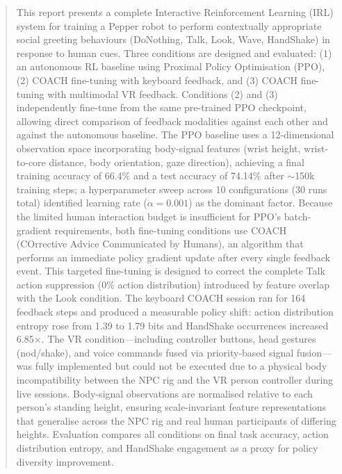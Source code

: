 \documentclass[../report.tex]{subfiles}
\begin{document}
    \begin{abstract}
        This report presents a complete Interactive Reinforcement Learning (IRL) system for training a Pepper robot to perform contextually appropriate social greeting behaviours (DoNothing, Talk, Look, Wave, HandShake) in response to human cues. Three conditions are designed and evaluated: (1) an autonomous RL baseline using Proximal Policy Optimisation (PPO), (2) COACH fine-tuning with keyboard feedback, and (3) COACH fine-tuning with multimodal VR feedback. Conditions (2) and (3) independently fine-tune from the same pre-trained PPO checkpoint, allowing direct comparison of feedback modalities against each other and against the autonomous baseline. The PPO baseline uses a 12-dimensional observation space incorporating body-signal features (wrist height, wrist-to-core distance, body orientation, gaze direction), achieving a final training accuracy of 66.4\% and a test accuracy of 74.14\% after $\sim$150k training steps; a hyperparameter sweep across 10 configurations (30 runs total) identified learning rate ($\alpha = 0.001$) as the dominant factor. Because the limited human interaction budget is insufficient for PPO's batch-gradient requirements, both fine-tuning conditions use COACH (COrrective Advice Communicated by Humans), an algorithm that performs an immediate policy gradient update after every single feedback event. This targeted fine-tuning is designed to correct the complete Talk action suppression (0\% action distribution) introduced by feature overlap with the Look condition. The keyboard COACH session ran for 164 feedback steps and produced a measurable policy shift: action distribution entropy rose from 1.39 to 1.79 bits and HandShake occurrences increased 6.85$\times$. The VR condition---including controller buttons, head gestures (nod/shake), and voice commands fused via priority-based signal fusion---was fully implemented but could not be executed due to a physical body incompatibility between the NPC rig and the VR person controller during live sessions. Body-signal observations are normalised relative to each person's standing height, ensuring scale-invariant feature representations that generalise across the NPC rig and real human participants of differing heights. Evaluation compares all conditions on final task accuracy, action distribution entropy, and HandShake engagement as a proxy for policy diversity improvement.
    \end{abstract}
\end{document}
